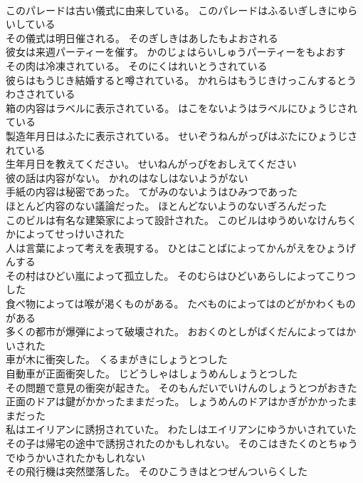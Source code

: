 \documentclass[8pt]{extreport}
\begin{document}
\begin{CJK}{UTF8}{min}
\\	このパレードは古い儀式に由来している。	このパレードはふるいぎしきにゆらいしている 
\\	その儀式は明日催される。	そのぎしきはあしたもよおされる 
\\	彼女は来週パーティーを催す。	かのじょはらいしゅうパーティーをもよおす 
\\	その肉は冷凍されている。	そのにくはれいとうされている 
\\	彼らはもうじき結婚すると噂されている。	かれらはもうじきけっこんするとうわさされている 
\\	箱の内容はラベルに表示されている。	はこをないようはラベルにひょうじされている 
\\	製造年月日はふたに表示されている。	せいぞうねんがっぴはぶたにひょうじされている 
\\	生年月日を教えてください。	せいねんがっぴをおしえてください 
\\	彼の話は内容がない。	かれのはなしはないようがない 
\\	手紙の内容は秘密であった。	てがみのないようはひみつであった 
\\	ほとんど内容のない議論だった。	ほとんどないようのないぎろんだった 
\\	このビルは有名な建築家によって設計された。	このビルはゆうめいなけんちくかによってせっけいされた 
\\	人は言葉によって考えを表現する。	ひとはことばによってかんがえをひょうげんする 
\\	その村はひどい嵐によって孤立した。	そのむらはひどいあらしによってこりつした 
\\	食べ物によっては喉が渇くものがある。	たべものによってはのどがかわくものがある 
\\	多くの都市が爆弾によって破壊された。	おおくのとしがばくだんによってはかいされた 
\\	車が木に衝突した。	くるまがきにしょうとつした 
\\	自動車が正面衝突した。	じどうしゃはしょうめんしょうとつした 
\\	その問題で意見の衝突が起きた。	そのもんだいでいけんのしょうとつがおきた 
\\	正面のドアは鍵がかかったままだった。	しょうめんのドアはかぎがかかったままだった 
\\	私はエイリアンに誘拐されていた。	わたしはエイリアンにゆうかいされていた 
\\	その子は帰宅の途中で誘拐されたのかもしれない。	そのこはきたくのとちゅうでゆうかいされたかもしれない 
\\	その飛行機は突然墜落した。	そのひこうきはとつぜんついらくした 

\end{CJK}
\end{document}
